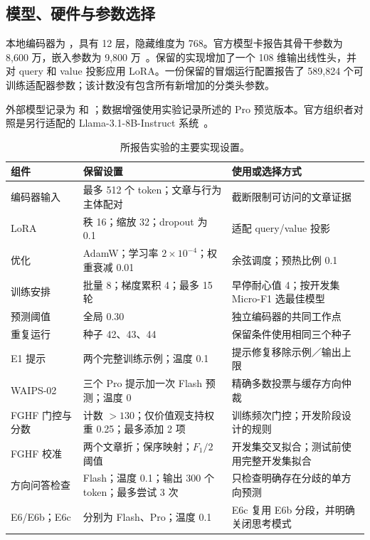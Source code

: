 \documentclass[12pt,a4paper]{article}
\begin{document}
\subsection{模型、硬件与参数选择}
本地编码器为 ，具有 12 层，隐藏维度为 768。官方模型卡报告其骨干参数为 8,600 万，嵌入参数为 9,800 万~\cite{debertacard}。保留的实现增加了一个 108 维输出线性头，并对 query 和 value 投影应用 LoRA。一份保留的冒烟运行配置报告了 589,824 个可训练适配器参数；该计数没有包含所有新增加的分类头参数。

外部模型记录为  和 ；数据增强使用实验记录所述的 Pro 预览版本。官方组织者对照是另行适配的 Llama-3.1-8B-Instruct 系统~\cite{fehuoverview}。

\begin{table}[htbp]
\centering\small
\caption{所报告实验的主要实现设置。}
\label{tab:settings}
\begin{tabularx}{\textwidth}{@{}P{3.25cm}YY@{}}
\toprule
组件 & 保留设置 & 使用或选择方式 \\
\midrule
编码器输入 & 最多 512 个 token；文章与行为主体配对 & 截断限制可访问的文章证据 \\
LoRA & 秩 16；缩放 32；dropout 为 0.1 & 适配 query/value 投影 \\
优化 & AdamW；学习率 $2\times10^{-4}$；权重衰减 0.01 & 余弦调度；预热比例 0.1 \\
训练安排 & 批量 8；梯度累积 4；最多 15 轮 & 早停耐心值 4；按开发集 Micro-F1 选最佳模型 \\
预测阈值 & 全局 0.30 & 独立编码器的共同工作点 \\
重复运行 & 种子 42、43、44 & 保留条件使用相同三个种子 \\
E1 提示 & 两个完整训练示例；温度 0.1 & 提示修复移除示例／输出上限 \\
WAIPS-02 & 三个 Pro 提示加一次 Flash 预测；温度 0 & 精确多数投票与缓存方向仲裁 \\
FGHF 门控与分数 & 计数 $>130$；仅价值观支持权重 0.25；最多添加 2 项 & 训练频次门控；开发阶段设计的规则 \\
FGHF 校准 & 两个文章折；保序映射；$F_1/2$ 阈值 & 开发集交叉拟合；测试前使用完整开发集拟合 \\
方向问答检查 & Flash；温度 0.1；输出 300 个 token；最多尝试 3 次 & 只检查明确存在分歧的单方向预测 \\
E6/E6b；E6c & 分别为 Flash、Pro；温度 0.1 & E6c 复用 E6b 分段，并明确关闭思考模式 \\
\bottomrule
\end{tabularx}
\end{table}
\end{document}

